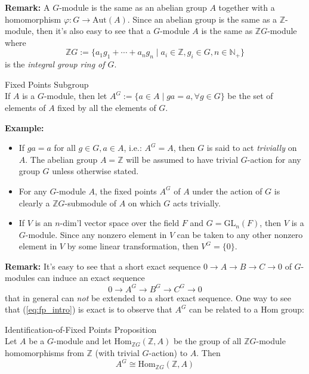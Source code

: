 \noindent\textbf{Remark:} A $G$-module is the same as an abelian group $A$ together with a homomorphism $\varphi:G \to \text{Aut} (A)$. Since an abelian group is the same as a $\mathbb{Z}$-module, then it's also easy to see that a $G$-module $A$ is the same as $\mathbb{Z}G$-module where
$$\mathbb{Z}G:= \{a_1g_1 +\cdots+ a_ng_n \mid a_i\in \mathbb{Z} ,g_i\in G,n\in \mathbb{N}_+ \}$$
is the \textit{integral group ring of $G$}.

\begin{definition}{Fixed Points Subgroup}\\
If $A$ is a $G$-module, then let $A^G:= \{a\in A\mid ga=a ,\forall g\in G\}$ be the set of elements of $A$ fixed by all the elements of $G$.
\end{definition}

\noindent\textbf{Example:} \begin{itemize}
    \item If $ga=a$ for all $g\in G,a\in A$, i.e.: $A^G=A$, then $G$ is said to act \textit{trivially} on $A$. The abelian group $A=\mathbb{Z}$ will be assumed to have trivial $G$-action for any group $G$ unless otherwise stated.

    \item For any $G$-module $A$, the fixed points $A^G$ of $A$ under the action of $G$ is clearly a $\mathbb{Z}G$-submodule of $A$ on which $G$ acts trivially.

    \item If $V$ is an $n$-dim'l vector space over the field $F$ and $G=\text{GL}_n(F)$, then $V$ is a $G$-module. Since any nonzero element in $V$ can be taken to any other nonzero element in $V$ by some linear transformation, then $V^G=\{0\}$.
\end{itemize}

\noindent\textbf{Remark:} It's easy to see that a short exact sequence $0\to A\to B\to C\to0$ of $G$-modules can induce an exact sequence 
\begin{equation}
    0\to A^G\to B^G\to C^G \to 0 \label{eq:fp_intro}
\end{equation}
that in general can \textit{not} be extended to a short exact sequence. One way to see that (\ref{eq:fp_intro}) is exact is to observe that $A^G$ can be related to a Hom group:


\begin{proposition}{Identification-of-Fixed Points Proposition}\\
Let $A$ be a $G$-module and let Hom$_{\mathbb{Z}G} (\mathbb{Z},A)$ be the group of all $\mathbb{Z}G$-module homomorphisms from $\mathbb{Z}$ (with trivial $G$-action) to $A$. Then
\[
A^G \cong \text{Hom}_{\mathbb{Z}G} (\mathbb{Z},A)
\]
\end{proposition}


